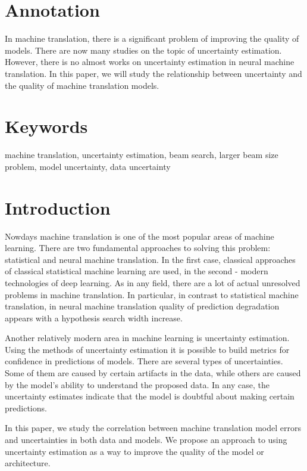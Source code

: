 \documentclass[a4paper,14pt]{extarticle}
\begin{document}
	\newpage

	{
		\hypersetup{linkcolor=black}
		\tableofcontents
	}

	\newpage
	
	\section{Annotation}
	In machine translation, there is a significant problem of improving the quality of models. There are now many studies on the topic of uncertainty estimation. However, there is no almost works on uncertainty estimation in neural machine translation. In this paper, we will study the relationship between uncertainty and the quality of machine translation models.
	\section{Keywords}
		machine translation, uncertainty estimation, beam search, larger beam size problem, model uncertainty, data uncertainty
		
	\section{Introduction}
	Nowdays machine translation is one of the most popular areas of machine learning. There are two fundamental approaches to solving this problem: statistical and neural machine translation. In the first case, classical approaches of classical statistical machine learning are used, in the second - modern technologies of deep learning. As in any field, there are a lot of actual unresolved problems in machine translation. In particular, in contrast to statistical machine translation, in neural machine translation  quality of prediction degradation appears with a hypothesis search width increase.
	
	Another relatively modern area in machine learning is uncertainty estimation. Using the methods of uncertainty estimation it is possible to build metrics for confidence in predictions of models. There are several types of uncertainties. Some of them are caused by certain artifacts in the data, while others are caused by the model's ability to understand the proposed data. In any case, the uncertainty estimates indicate that the model is doubtful about making certain predictions.	
	
	In this paper, we study the correlation between machine translation model errors and uncertainties in both data and models. We propose an approach to using uncertainty estimation as a way to improve the quality of the model or architecture.
\end{document}

